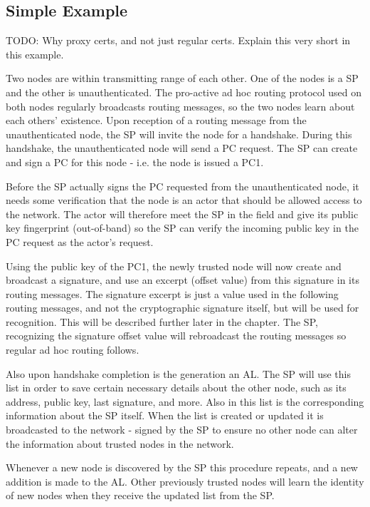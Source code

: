 \subsection{Simple Example}
TODO: Why proxy certs, and not just regular certs. Explain this very short in
this example.

Two nodes are within transmitting range of each other. One of the
nodes is a \ac{SP} and the other is unauthenticated. The pro-active ad hoc
routing protocol used on both nodes regularly broadcasts routing messages, so
the two nodes learn about each others' existence. Upon reception of a routing
message from the unauthenticated node, the \ac{SP} will invite the node for a
handshake. During this handshake, the unauthenticated node will send a \ac{PC}
request. The \ac{SP} can create and sign a \ac{PC} for this node - i.e. the node
is issued a \ac{PC1}.

Before the \ac{SP} actually signs the \ac{PC} requested from the unauthenticated
node, it needs some verification that the node is an actor that should be
allowed access to the network. The actor will therefore meet the \ac{SP} in the
field and give its public key fingerprint (out-of-band) so the \ac{SP} can
verify the incoming public key in the \ac{PC} request as the actor's request.

Using the public key of the \ac{PC1}, the newly trusted node will now create and 
broadcast a signature, and use an excerpt (offset value) from this signature
in its routing messages. The signature excerpt is just a value used in the
following routing messages, and not the cryptographic signature itself, but
will be used for recognition. This will be described further later in the
chapter. The \ac{SP}, recognizing the signature offset value will rebroadcast
the routing messages so regular ad hoc routing follows.

Also upon handshake completion is the generation an \ac{AL}. The \ac{SP} will
use this list in order to save certain necessary details about the other node,
such as its address, public key, last signature, and more. Also in this list is
the corresponding information about the \ac{SP} itself. When the list is created
or updated it is broadcasted to the network - signed by the \ac{SP} to ensure no
other node can alter the information about trusted nodes in the network.

Whenever a new node is discovered by the \ac{SP} this procedure repeats, and a
new addition is made to the \ac{AL}. Other previously trusted nodes will learn
the identity of new nodes when they receive the updated list from the \ac{SP}.

